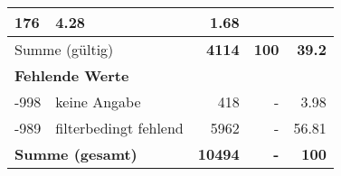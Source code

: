 \begin{longtable}{lXrrr}
       \num{176} &
       \num[round-mode=places,round-precision=2]{4.28} &
         \num[round-mode=places,round-precision=2]{1.68} \\
     \midrule
     \multicolumn{2}{l}{Summe (gültig)} &
       \textbf{\num{4114}} &
     \textbf{\num{100}} &
       \textbf{\num[round-mode=places,round-precision=2]{39.2}} \\
     \multicolumn{5}{l}{\textbf{Fehlende Werte}}\\
       -998 &
       keine Angabe &
         \num{418} &
        - &
         \num[round-mode=places,round-precision=2]{3.98} \\
       -989 &
       filterbedingt fehlend &
         \num{5962} &
        - &
         \num[round-mode=places,round-precision=2]{56.81} \\
     \midrule
     \multicolumn{2}{l}{\textbf{Summe (gesamt)}} &
          \textbf{\num{10494}} &
        \textbf{-} &
        \textbf{\num{100}} \\
     \bottomrule
     \end{longtable}
     
